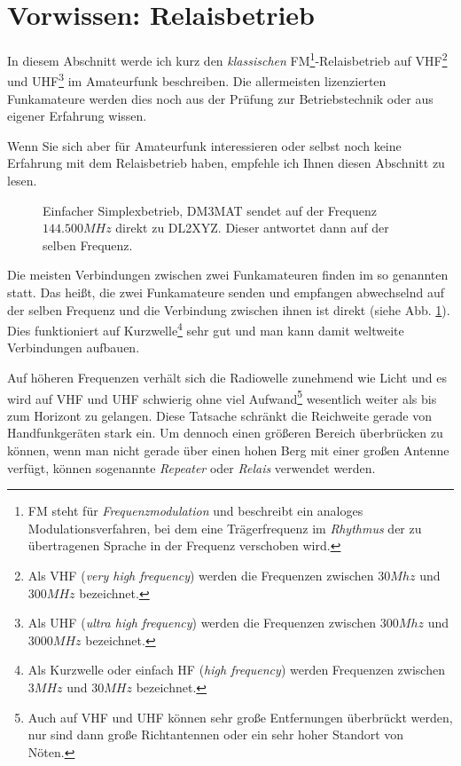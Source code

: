 \section{Vorwissen: Relaisbetrieb} \label{sec:vorwissen} 
In diesem Abschnitt werde ich kurz den \emph{klassischen} FM\footnote{FM steht für \emph{Frequenzmodulation} und beschreibt ein analoges Modulationsverfahren, bei dem eine Trägerfrequenz im \emph{Rhythmus} der zu übertragenen Sprache in der Frequenz verschoben wird.}-Relaisbetrieb auf VHF\footnote{Als VHF (\emph{very high frequency}) werden die Frequenzen zwischen $30Mhz$ und $300MHz$ bezeichnet.} und UHF\footnote{Als UHF (\emph{ultra high frequency}) werden die Frequenzen zwischen $300Mhz$ und $3000MHz$ bezeichnet.} im Amateurfunk beschreiben. Die allermeisten lizenzierten Funkamateure werden dies noch aus der Prüfung zur Betriebstechnik oder aus eigener Erfahrung wissen. 

Wenn Sie sich aber für Amateurfunk interessieren oder selbst noch keine Erfahrung mit dem Relaisbetrieb haben, empfehle ich Ihnen diesen Abschnitt zu lesen. 

\begin{figure}[!ht]
 \centering
 
 
 \caption{Einfacher Simplexbetrieb, DM3MAT sendet auf der Frequenz $144.500 MHz$ direkt zu DL2XYZ. Dieser antwortet dann auf der selben Frequenz.} \label{fig:basicsimlpex}
\end{figure}

Die meisten Verbindungen zwischen zwei Funkamateuren finden im so genannten  statt. Das heißt, die zwei Funkamateure senden und empfangen abwechselnd auf der selben Frequenz und die Verbindung zwischen ihnen ist direkt (siehe Abb. \ref{fig:basicsimlpex}). Dies funktioniert auf Kurzwelle\footnote{Als Kurzwelle oder einfach HF (\emph{high frequency}) werden Frequenzen zwischen $3MHz$ und $30MHz$ bezeichnet.} sehr gut und man kann damit weltweite Verbindungen aufbauen. 

Auf höheren Frequenzen verhält sich die Radiowelle zunehmend wie Licht und es wird auf VHF und UHF schwierig ohne viel Aufwand\footnote{Auch auf VHF und UHF können sehr große Entfernungen überbrückt werden, nur sind dann große Richtantennen oder ein sehr hoher Standort von Nöten.} wesentlich weiter als bis zum Horizont zu gelangen. Diese Tatsache schränkt die Reichweite gerade von Handfunkgeräten stark ein. Um dennoch einen größeren Bereich überbrücken zu können, wenn man nicht gerade über einen hohen Berg mit einer großen Antenne verfügt, können sogenannte \emph{Repeater} oder \emph{Relais} verwendet werden. 

